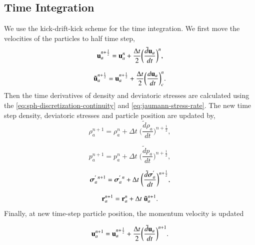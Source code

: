 \subsection{Time Integration}

We use the kick-drift-kick scheme for the time integration. We first move the
velocities of the particles to half time step,
\begin{equation}
  \label{eq:velocity-update-stage-1}
  \mathbf{u}_a^{n+\frac{1}{2}} = \mathbf{u}_a^{n} + \frac{\Delta t}{2} \bigg(\frac{\tilde{d}\mathbf{u}_{a}}{dt}\bigg)^n,
\end{equation}

\begin{equation}
  \label{eq:velocity-hat-update-stage-1}
  \mathbf{\tilde{u}}_a^{n+\frac{1}{2}} = \mathbf{u}_a^{n+\frac{1}{2}} + \frac{\Delta t}{2} \bigg(\frac{d\mathbf{u}_{a}}{dt}\bigg)^{n}_{c}.
\end{equation}
%
Then the time derivatives of density and deviatoric stresses are calculated
using the \cref{eq:sph-discretization-continuity} and
\cref{eq:jaumann-stress-rate}. The new time step density, deviatoric stresses
and particle position are updated by,
\begin{equation}
  \label{eq:density-update-stage-2}
  \rho_{a}^{n+1} = \rho_{a}^{n} + \Delta t \; \bigg(\frac{\tilde{d}\rho_{a}}{dt}\bigg)^{n+\frac{1}{2}},
\end{equation}

\begin{equation}
  \label{eq:pressure-update-stage-2}
  p_{a}^{n+1} = p_{a}^{n} + \Delta t \; \bigg(\frac{\tilde{d}p_{a}}{dt}\bigg)^{n+\frac{1}{2}},
\end{equation}

\begin{equation}
  \label{eq:stress-update-stage-2}
  \boldsymbol{\sigma}_{a}^{' \; n+1} = \boldsymbol{\sigma}_{a}^{' \; n} +
  \Delta t \; \bigg(\frac{\tilde{d}\boldsymbol{\sigma}^{'}_{a}}{dt}\bigg)^{n+\frac{1}{2}},
\end{equation}

\begin{equation}
  \label{eq:position-update-stage-2}
  \mathbf{r}_{a}^{n+1} = \mathbf{r}_{a}^{n} + \Delta t \; \mathbf{\tilde{u}}_{a}^{n+1}.
\end{equation}
%
Finally, at new time-step particle position, the momentum velocity is updated

\begin{equation}
  \label{eq:velocity-update-stage-3}
  \mathbf{u}_a^{n+1} = \mathbf{u}_a^{n+\frac{1}{2}} + \frac{\Delta t}{2} \bigg(\frac{\tilde{d}\mathbf{u}_{a}}{dt}\bigg)^{n+1}.
\end{equation}


